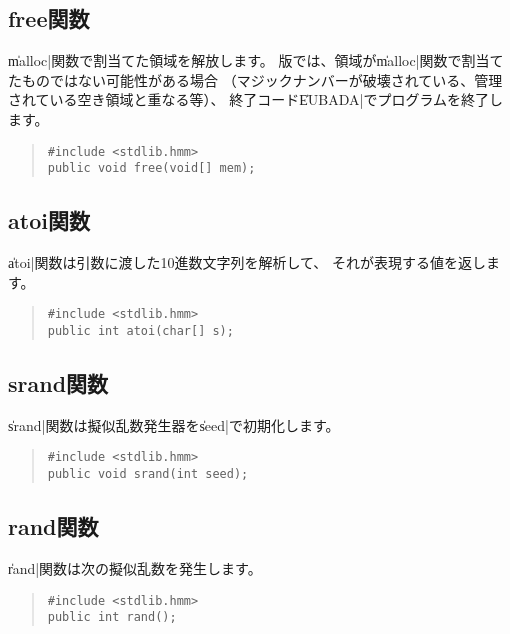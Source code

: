 \subsection{free関数}

\|malloc|関数で割当てた領域を解放します。
\tac 版では、領域が\|malloc|関数で割当てたものではない可能性がある場合
（マジックナンバーが破壊されている、管理されている空き領域と重なる等）、
終了コード\|EUBADA|でプログラムを終了します。

\begin{quote}
\begin{verbatim}
#include <stdlib.hmm>
public void free(void[] mem);
\end{verbatim}
\end{quote}

\subsection{atoi関数}

\|atoi|関数は引数に渡した10進数文字列を解析して、
それが表現する値を返します。

\begin{quote}
\begin{verbatim}
#include <stdlib.hmm>
public int atoi(char[] s);
\end{verbatim}
\end{quote}

\subsection{srand関数}

\|srand|関数は擬似乱数発生器を\|seed|で初期化します。

\begin{quote}
\begin{verbatim}
#include <stdlib.hmm>
public void srand(int seed);
\end{verbatim}
\end{quote}

\subsection{rand関数}

\|rand|関数は次の擬似乱数を発生します。

\begin{quote}
\begin{verbatim}
#include <stdlib.hmm>
public int rand();
\end{verbatim}
\end{quote}

